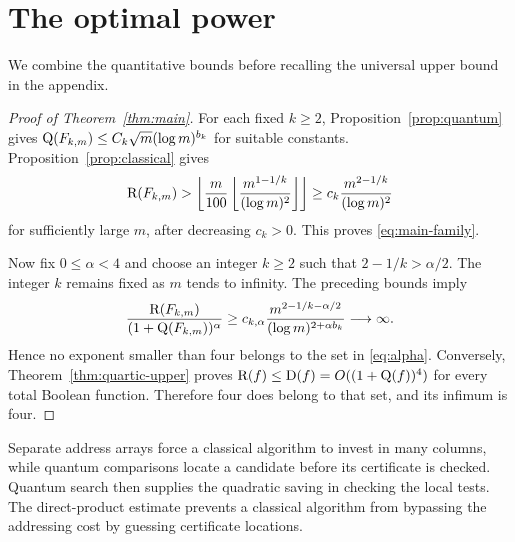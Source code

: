\section{The optimal power}\label{sec:exponent}

We combine the quantitative bounds before recalling the universal upper
bound in the appendix.

\begin{proof}[Proof of Theorem~\ref{thm:main}]
For each fixed $k\ge2$, Proposition~\ref{prop:quantum} gives
$\mathrm Q(F_{k,m})\le C_k\sqrt m(\log m)^{b_k}$ for suitable constants.
Proposition~\ref{prop:classical} gives
\[
 \mathrm R(F_{k,m})>
 \left\lfloor\frac m{100}
  \left\lfloor\frac{m^{1-1/k}}{(\log m)^2}\right\rfloor
 \right\rfloor
 \ge c_k\frac{m^{2-1/k}}{(\log m)^2}
\]
for sufficiently large $m$, after decreasing $c_k>0$.
This proves \eqref{eq:main-family}.

Now fix $0\le\alpha<4$ and choose an integer $k\ge2$ such that
$2-1/k>\alpha/2$. The integer $k$ remains fixed as $m$ tends to infinity.
The preceding bounds imply
\[
 \frac{\mathrm R(F_{k,m})}{(1+\mathrm Q(F_{k,m}))^\alpha}
 \ge c_{k,\alpha}
 \frac{m^{2-1/k-\alpha/2}}
 {(\log m)^{2+\alpha b_k}}
 \longrightarrow\infty.
\]
Hence no exponent smaller than four belongs to the set in
\eqref{eq:alpha}. Conversely, Theorem~\ref{thm:quartic-upper} proves
$\mathrm R(f)\le\mathrm D(f)=O((1+\mathrm Q(f))^4)$ for every total Boolean function.
Therefore four does belong to that set, and its infimum is four.
\end{proof}

Separate address arrays force a classical algorithm to invest in many
columns, while quantum comparisons locate a candidate before its
certificate is checked. Quantum search then supplies the quadratic
saving in checking the local tests. The direct-product estimate prevents
a classical algorithm from bypassing the addressing cost by guessing
certificate locations.
